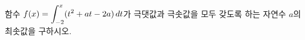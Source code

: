 함수 $f(x)=\displaystyle\int_{-2}^{x} (t^2+at-2a)\mkern3mu dt$가 극댓값과 극솟값을 모두 갖도록 하는 자연수 $a$의 최솟값을 구하시오.
